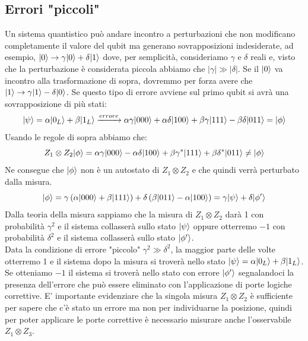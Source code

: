 \documentclass[12pt, a4paper]{report}
\begin{document}
\subsection{Errori "piccoli"}
Un sistema quantistico può andare incontro a perturbazioni che non modificano completamente il valore del qubit ma generano sovrapposizioni indesiderate, ad esempio, $| 0 \rangle\rightarrow\gamma| 0 \rangle+\delta| 1 \rangle$ dove, per semplicità, consideriamo $\gamma$ e $\delta$ reali e, visto che la perturbazione è considerata piccola abbiamo che $\left|\gamma\right|\gg \left|\delta\right|$. Se il $| 0 \rangle$ va incontro alla trasformazione di sopra, dovremmo per forza avere che $| 1 \rangle\rightarrow\gamma| 1 \rangle-\delta| 0 \rangle$. Se questo tipo di errore avviene sul primo qubit si avrà una sovrapposizione di più stati:
\begin{equation*}
    | \psi \rangle = \alpha| 0_{L} \rangle+\beta| 1_{L} \rangle  \xrightarrow{errore} \alpha\gamma| 000 \rangle+\alpha\delta| 100 \rangle+\beta\gamma| 111 \rangle-\beta\delta| 011 \rangle = | \phi \rangle
\end{equation*}
Usando le regole di sopra abbiamo che:
\begin{equation*}
    Z_{1}\otimes Z_{2}| \phi \rangle=\alpha\gamma| 000 \rangle-\alpha\delta| 100 \rangle+\beta\gamma^{*}| 111 \rangle+\beta\delta^{*}| 011 \rangle \neq | \phi \rangle
\end{equation*}
Ne consegue che $| \phi \rangle$ non è un autostato di $Z_{1}\otimes Z_{2}$ e che quindi verrà perturbato dalla misura.
\begin{equation*}
    | \phi \rangle = \gamma\left(\alpha| 000 \rangle+\beta| 111 \rangle\right)+\delta\left(\beta| 011 \rangle-\alpha| 100 \rangle\right) = \gamma| \psi \rangle+\delta| \phi' \rangle
\end{equation*}
Dalla teoria della misura sappiamo che la misura di $Z_{1}\otimes Z_{2}$ darà 1 con probabilità $\gamma^{2}$ e il sistema collasserà sullo stato $| \psi \rangle$ oppure otterremo $-1$ con probabilità $\delta^{2}$ e il sistema collasserà sullo stato $| \phi' \rangle$.\\
Data la condizione di errore "piccolo" $\gamma^{2}\gg \delta^{2}$, la maggior parte delle volte otterremo 1 e il sistema dopo la misura si troverà nello stato $| \psi \rangle=\alpha| 0_{L} \rangle+\beta| 1_{L} \rangle$. Se otteniamo $-1$ il sistema si troverà nello stato con errore $| \phi' \rangle$ segnalandoci la presenza dell'errore che può essere eliminato con l'applicazione di porte logiche correttive. E' importante evidenziare che la singola misura $Z_{1}\otimes Z_{2}$ è sufficiente per sapere che c'è stato un errore ma non per individuarne la posizione, quindi per poter applicare le porte correttive è necessario misurare anche l'osservabile $Z_{1}\otimes Z_{3}$.\\
\end{document}
